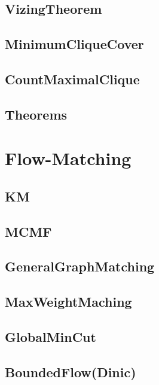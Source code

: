 	\subsection{VizingTheorem}
	
	\subsection{MinimumCliqueCover}
	
	\subsection{CountMaximalClique}
	
	\subsection{Theorems}
	
\section{Flow-Matching}
	\subsection{KM}
	
	\subsection{MCMF}
	
	\subsection{GeneralGraphMatching}
	
	\subsection{MaxWeightMaching}
	
	\subsection{GlobalMinCut}
	
	\subsection{BoundedFlow(Dinic)}
	
